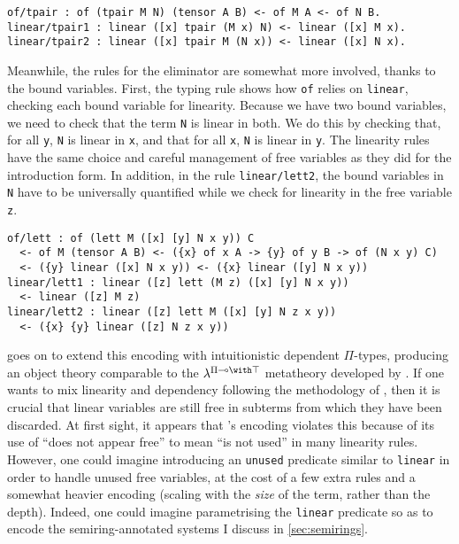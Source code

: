 \begin{verbatim}
of/tpair : of (tpair M N) (tensor A B) <- of M A <- of N B.
linear/tpair1 : linear ([x] tpair (M x) N) <- linear ([x] M x).
linear/tpair2 : linear ([x] tpair M (N x)) <- linear ([x] N x).
\end{verbatim}

Meanwhile, the rules for the eliminator are somewhat more involved, thanks to
the bound variables.
First, the typing rule shows how \texttt{of} relies on \texttt{linear}, checking
each bound variable for linearity.
Because we have two bound variables, we need to check that the term \texttt{N}
is linear in both.
We do this by checking that, for all \texttt{y}, \texttt{N} is linear in
\texttt{x}, and that for all \texttt{x}, \texttt{N} is linear in \texttt{y}.
The linearity rules have the same choice and careful management of free
variables as they did for the introduction form.
In addition, in the rule \texttt{linear/lett2}, the bound variables in
\texttt{N} have to be universally quantified while we check for linearity in the
free variable \texttt{z}.

\begin{verbatim}
of/lett : of (lett M ([x] [y] N x y)) C
  <- of M (tensor A B) <- ({x} of x A -> {y} of y B -> of (N x y) C)
  <- ({y} linear ([x] N x y)) <- ({x} linear ([y] N x y))
linear/lett1 : linear ([z] lett (M z) ([x] [y] N x y))
  <- linear ([z] M z)
linear/lett2 : linear ([z] lett M ([x] [y] N z x y))
  <- ({x} {y} linear ([z] N z x y))
\end{verbatim}

 goes on to extend this encoding with intuitionistic dependent
$\Pi$-types, producing an object theory comparable to the
$\lambda^{\Pi\multimap\with\top}$ metatheory developed by \citet{CP02}.
If one wants to mix linearity and dependency following the methodology of
\citet{Atkey18}, then it is crucial that linear variables are still free in
subterms from which they have been discarded.
At first sight, it appears that \citeauthor{crary10}'s encoding violates this
because of its use of ``does not appear free'' to mean ``is not used'' in many
linearity rules.
However, one could imagine introducing an \texttt{unused} predicate similar to
\texttt{linear} in order to handle unused free variables, at the cost of a few
extra rules and a somewhat heavier encoding (scaling with the \emph{size} of the
term, rather than the depth).
Indeed, one could imagine parametrising the \texttt{linear} predicate so as to
encode the semiring-annotated systems I discuss in \cref{sec:semirings}.

